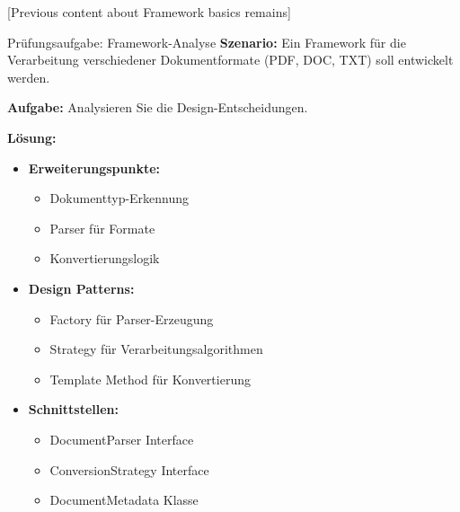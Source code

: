 [Previous content about Framework basics remains]

\begin{example}{Prüfungsaufgabe: Framework-Analyse}
\textbf{Szenario:}
Ein Framework für die Verarbeitung verschiedener Dokumentformate (PDF, DOC, TXT) 
soll entwickelt werden.

\textbf{Aufgabe:}
Analysieren Sie die Design-Entscheidungen.

\textbf{Lösung:}
\begin{itemize}
    \item \textbf{Erweiterungspunkte:}
    \begin{itemize}
        \item Dokumenttyp-Erkennung
        \item Parser für Formate
        \item Konvertierungslogik
    \end{itemize}
    
    \item \textbf{Design Patterns:}
    \begin{itemize}
        \item Factory für Parser-Erzeugung
        \item Strategy für Verarbeitungsalgorithmen
        \item Template Method für Konvertierung
    \end{itemize}
    
    \item \textbf{Schnittstellen:}
    \begin{itemize}
        \item DocumentParser Interface
        \item ConversionStrategy Interface
        \item DocumentMetadata Klasse
    \end{itemize}
\end{itemize}
\end{example}

